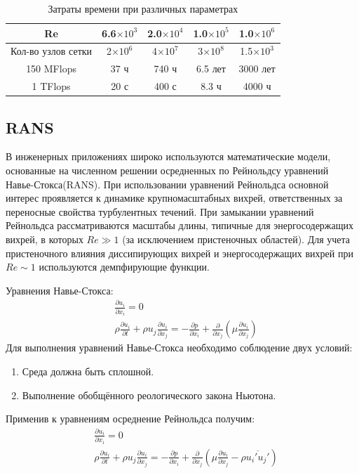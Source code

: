 	\begin{table}[H]
		\begin{center}
			\begin{tabular}{|c|c|c|c|c|}
				\hline
				Re & 6.6$\times10^3$ & 2.0$\times10^4$ & 1.0$\times10^5$ & 1.0$\times10^6$\\
				\hline
				Кол-во узлов сетки & 2$\times10^6$ & 4$\times10^7$ & 3$\times10^8$ & 1.5$\times10^3$\\
				\hline
				150 MFlops & 37 ч & 740 ч & 6.5 лет & 3000 лет\\
				\hline
				1 TFlops & 20 с & 400 с & 8.3 ч & 4000 ч\\
				\hline
			\end{tabular}
		\end{center}
		\caption{Затраты времени при различных параметрах}
	\end{table}

\subsection{RANS}
	
	В инженерных приложениях широко используются математические модели, основанные на численном решении осредненных по Рейнольдсу уравнений Навье-Стокса(RANS). При использовании уравнений Рейнольдса основной интерес проявляется к динамике крупномасштабных вихрей, ответственных за переносные свойства турбулентных течений. При замыкании уравнений Рейнольдса рассматриваются масштабы длины, типичные для энергосодержащих вихрей, в которых $Re\gg1$ (за исключением пристеночных областей). Для учета пристеночного влияния диссипирующих вихрей и энергосодержащих вихрей при $Re\sim1$ используются демпфирующие функции.
	
	Уравнения Навье-Стокса:
	\begin{align}
		&\frac{\partial u_i}{\partial x_i} = 0 \nonumber\\
		&\rho\frac{\partial u_i}{\partial t} + \rho u_j \frac{\partial u_i}{\partial x_j} = - \frac{\partial p}{\partial x_i} + \frac{\partial}{\partial x_j}(\mu\frac{\partial u_i}{\partial x_j})
	\end{align}
	Для выполнения уравнений Навье-Стокса необходимо соблюдение двух условий:
	\begin{enumerate}
		\item Среда должна быть сплошной.
		\item Выполнение обобщённого реологического закона Ньютона.
	\end{enumerate}
	Применив к уравнениям осреднение Рейнольдса получим:
	\begin{align}
				&\frac{\partial u_i}{\partial x_i} = 0 \nonumber\\
				&\rho\frac{\partial u_i}{\partial t} + \rho u_j \frac{\partial u_i}{\partial x_j} = - \frac{\partial p}{\partial x_i} + \frac{\partial}{\partial x_j}(\mu\frac{\partial u_i}{\partial x_j} - \rho\overline{u_i' u_j'})
	\end{align}
	
